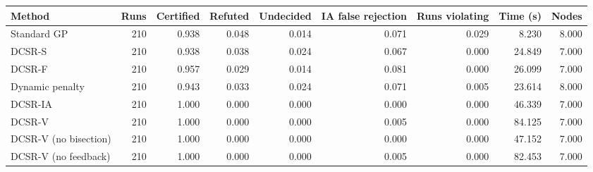 \begin{tabular}{lrrrrrrrr}
\toprule
Method & Runs & Certified & Refuted & Undecided & IA false rejection & Runs violating & Time (s) & Nodes \\
\midrule
Standard GP & 210 & 0.938 & 0.048 & 0.014 & 0.071 & 0.029 & 8.230 & 8.000 \\
DCSR-S & 210 & 0.938 & 0.038 & 0.024 & 0.067 & 0.000 & 24.849 & 7.000 \\
DCSR-F & 210 & 0.957 & 0.029 & 0.014 & 0.081 & 0.000 & 26.099 & 7.000 \\
Dynamic penalty & 210 & 0.943 & 0.033 & 0.024 & 0.071 & 0.005 & 23.614 & 8.000 \\
DCSR-IA & 210 & 1.000 & 0.000 & 0.000 & 0.000 & 0.000 & 46.339 & 7.000 \\
DCSR-V & 210 & 1.000 & 0.000 & 0.000 & 0.005 & 0.000 & 84.125 & 7.000 \\
DCSR-V (no bisection) & 210 & 1.000 & 0.000 & 0.000 & 0.000 & 0.000 & 47.152 & 7.000 \\
DCSR-V (no feedback) & 210 & 1.000 & 0.000 & 0.000 & 0.005 & 0.000 & 82.453 & 7.000 \\
\bottomrule
\end{tabular}
